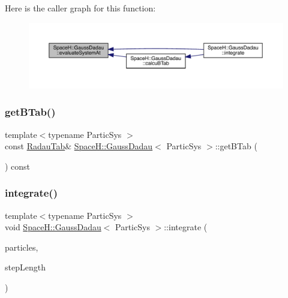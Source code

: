 Here is the caller graph for this function\+:
\nopagebreak
\begin{figure}[H]
\begin{center}
\leavevmode
\includegraphics[width=350pt]{class_space_h_1_1_gauss_dadau_a135095dd4f33570045a327dec46e6840_icgraph}
\end{center}
\end{figure}
\mbox{\label{class_space_h_1_1_gauss_dadau_acd80e3ae759660e91227ff4c83da01f1}} 
\subsubsection{\texorpdfstring{get\+B\+Tab()}{getBTab()}}
{\footnotesize\ttfamily template$<$typename Partic\+Sys $>$ \\
const \mbox{\hyperlink{class_space_h_1_1_gauss_dadau_aa191c67a1447ce70b7ec2dae6b061176}{Radau\+Tab}}\& \mbox{\hyperlink{class_space_h_1_1_gauss_dadau}{Space\+H\+::\+Gauss\+Dadau}}$<$ Partic\+Sys $>$\+::get\+B\+Tab (\begin{DoxyParamCaption}{ }\end{DoxyParamCaption}) const\hspace{0.3cm}{\ttfamily [inline]}}

\mbox{\label{class_space_h_1_1_gauss_dadau_a5ce29f965ea0376d9fb3fddf116926b1}} 
\subsubsection{\texorpdfstring{integrate()}{integrate()}}
{\footnotesize\ttfamily template$<$typename Partic\+Sys $>$ \\
void \mbox{\hyperlink{class_space_h_1_1_gauss_dadau}{Space\+H\+::\+Gauss\+Dadau}}$<$ Partic\+Sys $>$\+::integrate (\begin{DoxyParamCaption}\item[{Partic\+Sys \&}]{particles,  }\item[{\mbox{\hyperlink{class_space_h_1_1_gauss_dadau_ace42540e9fb47d7f1d1f00622bbd1ccb}{Scalar}}}]{step\+Length }\end{DoxyParamCaption})\hspace{0.3cm}{\ttfamily [inline]}}



